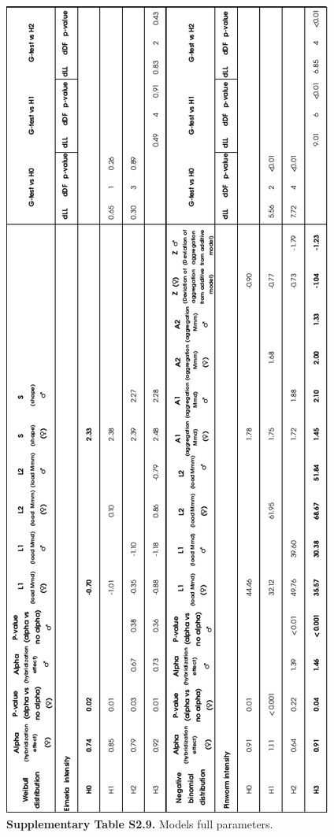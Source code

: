 \begin{figure}[H]
	\centering
	\includegraphics[width=\linewidth,height=\textheight,keepaspectratio]{images/2article1/SupplementaryTableS9.pdf}
	\captionsetup{labelformat=empty}
	\caption{\textbf{Supplementary Table S2.9.} Models full parameters.}
\end{figure}

